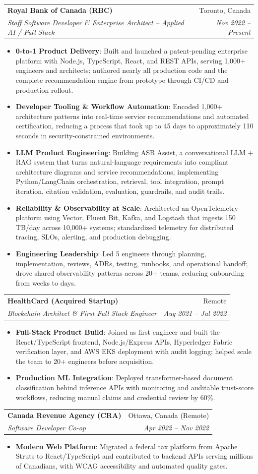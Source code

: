 \documentclass[letterpaper,9.5pt]{article}
\makeatletter
\newcommand{\resumeItem}[2]{\item\small{\textbf{#1}{: #2 \vspace{-2pt}}}}
\newcommand{\resumeSubheading}[4]{\vspace{-2pt}\item\begin{tabular*}{0.97\textwidth}{l@{\extracolsep{\fill}}r}\textbf{#1} & #2 \\\textit{\small#3} & \textit{\small #4} \\\end{tabular*}\vspace{-6pt}}
\newcommand{\resumeItemListStart}{\begin{itemize}}
\newcommand{\resumeItemListEnd}{\end{itemize}\vspace{-6pt}}
\makeatother
\begin{document}
  \resumeSubheading
    {Royal Bank of Canada (RBC)}{Toronto, Canada}
    {Staff Software Developer \& Enterprise Architect -- Applied AI / Full Stack}{Nov 2022 -- Present}
  \resumeItemListStart
    \resumeItem{0-to-1 Product Delivery}
      {Built and launched a patent-pending enterprise platform with Node.js, TypeScript, React, and REST APIs, serving 1,000+ engineers and architects; authored nearly all production code and the complete recommendation engine from prototype through CI/CD and production rollout.}
    \resumeItem{Developer Tooling \& Workflow Automation}
      {Encoded 1,000+ architecture patterns into real-time service recommendations and automated certification, reducing a process that took up to 45 days to approximately 110 seconds in security-constrained environments.}
    \resumeItem{LLM Product Engineering}
      {Building ASB Assist, a conversational LLM + RAG system that turns natural-language requirements into compliant architecture diagrams and service recommendations; implementing Python/LangChain orchestration, retrieval, tool integration, prompt iteration, citation validation, evaluation, guardrails, and audit trails.}
    \resumeItem{Reliability \& Observability at Scale}
      {Architected an OpenTelemetry platform using Vector, Fluent Bit, Kafka, and Logstash that ingests 150\,TB/day across 10,000+ systems; standardized telemetry for distributed tracing, SLOs, alerting, and production debugging.}
    \resumeItem{Engineering Leadership}
      {Led 5 engineers through planning, implementation, reviews, ADRs, testing, runbooks, and operational handoff; drove shared observability patterns across 20+ teams, reducing onboarding from weeks to days.}
  \resumeItemListEnd

  \resumeSubheading
    {HealthCard (Acquired Startup)}{Remote}
    {Blockchain Architect \& First Full Stack Engineer}{Aug 2021 -- Jul 2022}
  \resumeItemListStart
    \resumeItem{Full-Stack Product Build}
      {Joined as first engineer and built the React/TypeScript frontend, Node.js/Express APIs, Hyperledger Fabric verification layer, and AWS EKS deployment with audit logging; helped scale the team to 20+ engineers before acquisition.}
    \resumeItem{Production ML Integration}
      {Deployed transformer-based document classification behind inference APIs with monitoring and auditable trust-score workflows, reducing manual claims and credential review by 60\%.}
  \resumeItemListEnd

  \resumeSubheading
    {Canada Revenue Agency (CRA)}{Ottawa, Canada (Remote)}
    {Software Developer Co-op}{Apr 2022 -- Nov 2022}
  \resumeItemListStart
    \resumeItem{Modern Web Platform}
      {Migrated a federal tax platform from Apache Struts to React/TypeScript and contributed to backend APIs serving millions of Canadians, with WCAG accessibility and automated quality gates.}
  \resumeItemListEnd
\end{document}
